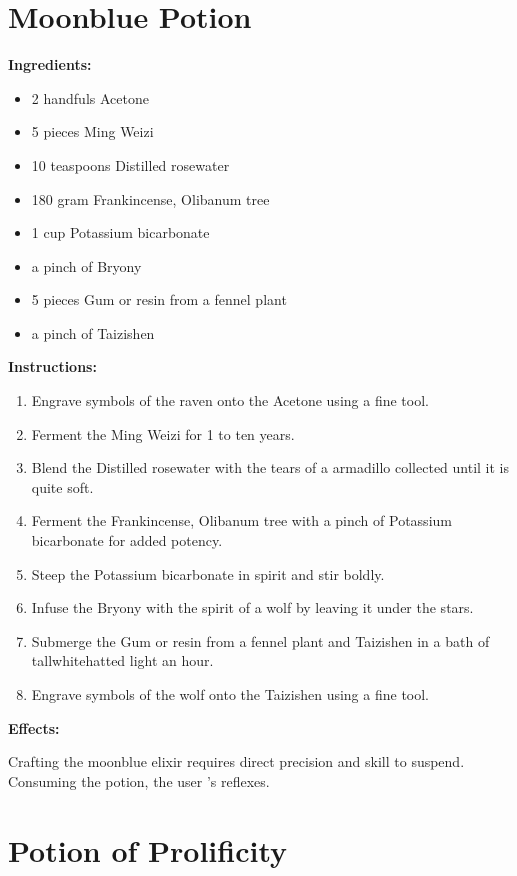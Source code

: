 \documentclass{article}
\begin{document}
\newpage
\section*{Moonblue Potion}

\textbf{Ingredients:}

\begin{itemize}
  \item 2 handfuls Acetone
  \item 5 pieces Ming Weizi
  \item 10 teaspoons Distilled rosewater
  \item 180 gram Frankincense, Olibanum tree
  \item 1 cup Potassium bicarbonate
  \item a pinch of Bryony
  \item 5 pieces Gum or resin from a fennel plant
  \item a pinch of Taizishen
\end{itemize}

\textbf{Instructions:}

\begin{enumerate}
  \item Engrave symbols of the raven onto the Acetone using a fine tool.
  \item Ferment the Ming Weizi for 1 to ten years.
  \item Blend the Distilled rosewater with the tears of a armadillo collected until it is quite soft.
  \item Ferment the Frankincense, Olibanum tree with a pinch of Potassium bicarbonate for added potency.
  \item Steep the Potassium bicarbonate in spirit and stir boldly.
  \item Infuse the Bryony with the spirit of a wolf by leaving it under the stars.
  \item Submerge the Gum or resin from a fennel plant and Taizishen in a bath of tallwhitehatted light an hour.
  \item Engrave symbols of the wolf onto the Taizishen using a fine tool.
\end{enumerate}

\textbf{Effects:}

Crafting the moonblue elixir requires direct precision and skill to suspend. Consuming the potion, the user 's reflexes.

\newpage
\section*{Potion of Prolificity}
\end{document}
